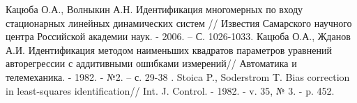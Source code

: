 \documentclass[14pt,a4paper]{moderncv}
\makeatletter
\renewcommand*{\bibliographyitemlabel}{\@biblabel{\arabic{enumiv}}}
\makeatother
\begin{document}


%


\begin{thebibliography}{99}
Кацюба О.А., Волныкин А.Н. Идентификация многомерных по входу стационарных линейных динамических систем // Известия Самарского научного центра Российской академии наук. - 2006. – С. 1026-1033.
Кацюба О.А., Жданов А.И. Идентификация методом наименьших квадратов параметров уравнений авторегрессии с аддитивными ошибками измерений// Автоматика и телемеханика. - 1982. - №2. – с. 29-38 .
Stoica P., Soderstrom T. Bias correction in least-squares identification// Int. J. Control. - 1982. - v. 35, № 3. - p. 452.
\end{thebibliography}
\end{document}
